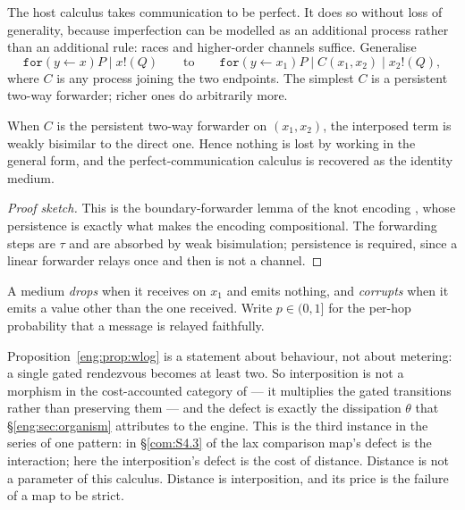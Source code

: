 The host calculus takes communication to be perfect. It does so without
loss of generality, because imperfection can be modelled as an additional
process rather than an additional rule: races and higher-order channels
suffice. Generalise
\[
  \texttt{for}(y \leftarrow x)P \mid x!(Q)
  \qquad\text{to}\qquad
  \texttt{for}(y \leftarrow x_1)P \mid C(x_1,x_2) \mid x_2!(Q),
\]
where $C$ is any process joining the two endpoints. The simplest $C$ is a
persistent two-way forwarder; richer ones do arbitrarily more.

\begin{proposition}\label{eng:prop:wlog}
When $C$ is the persistent two-way forwarder on $(x_1,x_2)$, the interposed
term is weakly bisimilar to the direct one. Hence nothing is lost by
working in the general form, and the perfect-communication calculus is
recovered as the identity medium.
\end{proposition}

\begin{proof}[Proof sketch]
This is the boundary-forwarder lemma of the knot encoding
\cite{KnotsNote}, whose persistence is exactly what makes the encoding
compositional. The forwarding steps are $\tau$ and are absorbed by weak
bisimulation; persistence is required, since a linear forwarder relays once
and then is not a channel.
\end{proof}

\begin{definition}\label{eng:loss-corruption}
A medium \emph{drops} when it receives on $x_1$ and emits nothing, and
\emph{corrupts} when it emits a value other than the one received. Write
$p \in (0,1]$ for the per-hop probability that a message is relayed
faithfully.
\end{definition}

\begin{remark}
\label{eng:rem:notmorphism}
Proposition~\ref{eng:prop:wlog} is a statement about behaviour, not about
metering: a single gated rendezvous becomes at least two. So interposition
is not a morphism in the cost-accounted category of \cite{CE} --- it
multiplies the gated transitions rather than preserving them --- and the
defect is exactly the dissipation $\theta$ that \S\ref{eng:sec:organism}
attributes to the engine. This is the third instance in the series of one
pattern: in \S\ref{com:S4.3} of \chComp the lax comparison map's defect is the
interaction; here the interposition's defect is the cost of distance.
Distance is not a parameter of this calculus. Distance is interposition,
and its price is the failure of a map to be strict.
\end{remark}

